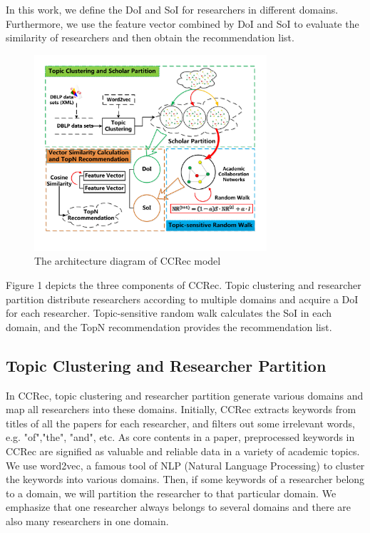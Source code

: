\documentclass{acm_proc_article-sp}
\begin{document}
In this work, we define the DoI and SoI for researchers in different domains. Furthermore, we use the feature vector combined by DoI and SoI to evaluate the similarity of researchers and then obtain the recommendation list.


\begin{figure}
\centering
\includegraphics [width=3.4in]{Fig1.pdf}
\caption{The architecture diagram of CCRec model}
\end{figure}

Figure 1 depicts the three components of CCRec. Topic clustering and researcher partition distribute researchers according to multiple domains and acquire a DoI for each researcher. Topic-sensitive random walk calculates the SoI in each domain, and the TopN recommendation provides the recommendation list.

\subsection{Topic Clustering and Researcher Partition}
In CCRec, topic clustering and researcher partition generate various domains and map all researchers into these domains. Initially, CCRec extracts keywords from titles of all the papers for each researcher, and filters out some irrelevant words, e.g. "of","the", "and", etc. As core contents in a paper, preprocessed keywords in CCRec are signified as valuable and reliable data in a variety of academic topics. We use word2vec, a famous tool of NLP (Natural Language Processing) to cluster the keywords into various domains. Then, if some keywords of a researcher belong to a domain, we will partition the researcher to that particular domain. We emphasize that one researcher always belongs to several domains and there are also many researchers in one domain.
\end{document}
